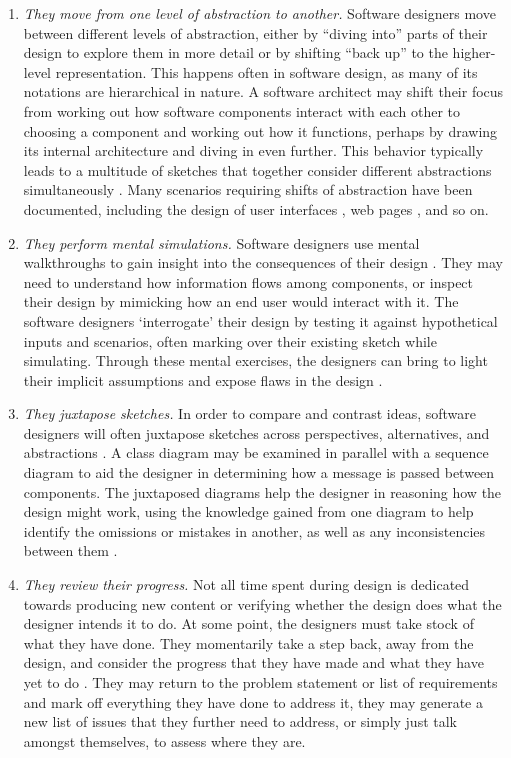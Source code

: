 \begin{enumerate}
 \item \emph{They move from one level of abstraction to another.} Software designers move between different levels of abstraction, either by ``diving into'' parts of their design to explore them in more detail or by shifting ``back up'' to the higher-level representation. This happens often in software design, as many of its notations are hierarchical in nature. A software architect may shift their focus from working out how software components interact with each other to choosing a component and working out how it functions, perhaps by drawing its internal architecture and diving in even further. This behavior typically leads to a multitude of sketches that together consider different abstractions simultaneously \cite{petre2009insights}. Many scenarios requiring shifts of abstraction have been documented, including the design of user interfaces \cite{da2001user}, web pages \cite{van2003design}, and so on.

 \item \emph{They perform mental simulations.} Software designers use mental walkthroughs to gain insight into the consequences of their design \cite{zannier2007model}. They may need to understand how information flows among components, or inspect their design by mimicking how an end user would interact with it. The software designers `interrogate' their design by testing it against hypothetical inputs and scenarios, often marking over their existing sketch while simulating. Through these mental exercises, the designers can bring to light their implicit assumptions and expose flaws in the design \cite{petre2009insights}. 

 \item \emph{They juxtapose sketches.} In order to compare and contrast ideas, software designers will often juxtapose sketches across perspectives, alternatives, and abstractions \cite{petre2009insights}. A class diagram may be examined in parallel with a sequence diagram to aid the designer in determining how a message is passed between components. The juxtaposed diagrams help the designer in reasoning how the design might work, using the knowledge gained from one diagram to help identify the omissions or mistakes in another, as well as any inconsistencies between them \cite{petre2009insights}. 

 \item \emph{They review their progress.} Not all time spent during design is dedicated towards producing new content or verifying whether the design does what the designer intends it to do. At some point, the designers must take stock of what they have done. They momentarily take a step back, away from the design, and consider the progress that they have made and what they have yet to do \cite{mangano2012design}. They may return to the problem statement or list of requirements and mark off everything they have done to address it, they may generate a new list of issues that they further need to address, or simply just talk amongst themselves, to assess where they are.
 

\end{enumerate}

